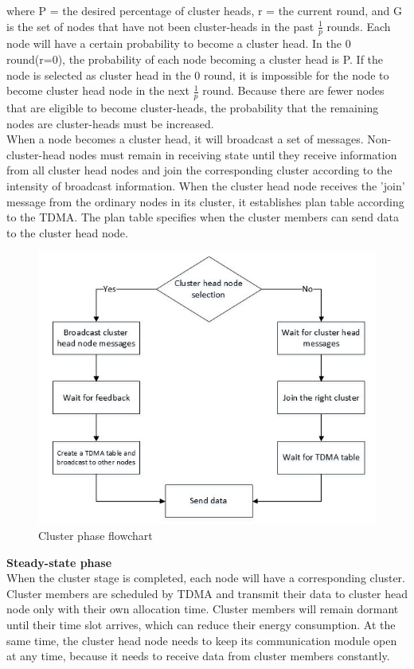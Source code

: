 \documentclass[11pt]{report}
\begin{document}
\begin{itemize}
		where P = the desired percentage of cluster heads, r = the current round, and G is the set of nodes that have not been cluster-heads in the past $\frac{1}{p}$ rounds. Each node will have a certain probability to become a cluster head. In the 0 round(r=0), the probability of each node becoming a cluster head is P. If the node is selected as cluster head in the 0 round, it is impossible for the node to become cluster head node in the next $\frac{1}{p}$ round. Because there are fewer nodes that are eligible to become cluster-heads, the probability that the remaining nodes are cluster-heads must be increased. \\
		When a node becomes a cluster head, it will broadcast a set of messages. Non-cluster-head nodes must remain in receiving state until they receive information from all cluster head nodes and join the corresponding cluster according to the intensity of broadcast information. When the cluster head node receives the 'join' message from the ordinary nodes in its cluster, it establishes plan table according to the TDMA. The plan table specifies when the cluster members can send data to the cluster head node. 
		\begin{figure}[h!]
			\centering
			\includegraphics[width=0.6\linewidth]{flowchart.jpg}
			\caption{Cluster phase flowchart}
			\label{}
		\end{figure}
		
		  
		\textbf{Steady-state phase}\\
		When the cluster stage is completed, each node will have a corresponding cluster. Cluster members are scheduled by TDMA and transmit their data to cluster head node only with their own allocation time. Cluster members will remain dormant until their time slot arrives, which can reduce their energy consumption. At the same time, the cluster head node needs to keep its communication module open at any time, because it needs to receive data from cluster members constantly. 
		

\end{itemize}
\end{document}
